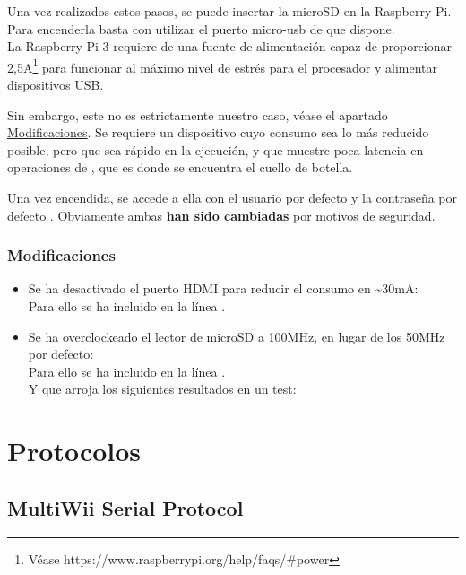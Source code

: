 Una vez realizados estos pasos, se puede insertar la microSD en la Raspberry Pi. Para encenderla basta con utilizar el puerto micro-usb de que dispone.\\La Raspberry Pi 3 requiere de una fuente de alimentación capaz de proporcionar 2,5A\footnote{Véase https://www.raspberrypi.org/help/faqs/\#power} para funcionar al máximo nivel de estrés para el procesador y alimentar dispositivos USB.

Sin embargo, este no es estrictamente nuestro caso, véase el apartado \hyperref[subsec:Modificaciones]{Modificaciones}. Se requiere un dispositivo cuyo consumo sea lo más reducido posible, pero que sea rápido en la ejecución, y que muestre poca latencia en operaciones de , que es donde se encuentra el cuello de botella.

Una vez encendida, se accede a ella con el usuario por defecto  y la contraseña por defecto . Obviamente ambas \textbf{han sido cambiadas} por motivos de seguridad.



\subsubsection{Modificaciones}
\label{subsec:Modificaciones}
\begin{itemize}
\item Se ha desactivado el puerto HDMI para reducir el consumo en \textasciitilde{}30mA: \\Para ello se ha incluido en  la línea .
\item Se ha overclockeado el lector de microSD a 100MHz, en lugar de los 50MHz por defecto: \\Para ello se ha incluido en  la línea .\\Y que arroja los siguientes resultados en un test:
\end{itemize} 




\section{Protocolos}

\subsection{MultiWii Serial Protocol}

